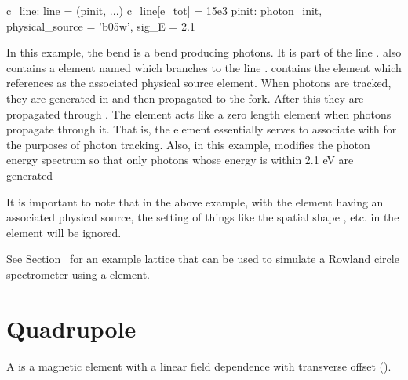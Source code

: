 {\begin{example}
  c_line: line = (pinit, ...)
  c_line[e_tot] = 15e3
  pinit: photon_init, physical_source = 'b05w', sig_E = 2.1
\end{example}
In this example, the bend  is a bend producing photons. It is
part of the line .  also contains a
 element named  which branches to the line
.  contains the  element
 which references  as the associated physical
source element. When photons are tracked, they are generated in
 and then propagated to the  fork.  After this they
are propagated through . The  element acts like a
zero length  element when photons propagate through
it. That is, the  element essentially serves to associate
 with  for the purposes of photon tracking. Also,
in this example,  modifies the photon energy spectrum so
that only photons whose energy is within 2.1 eV are generated

It is important to note that in the above example, with the
 element having an associated physical source, the
setting of things like the spatial shape , etc. in the
 element will be ignored.

See Section~ for an example lattice that can be used to simulate
a Rowland circle spectrometer using a  element.

\section{Quadrupole}
\label{s:quad}

A  is a magnetic element with a linear field dependence
with transverse offset ().

}
